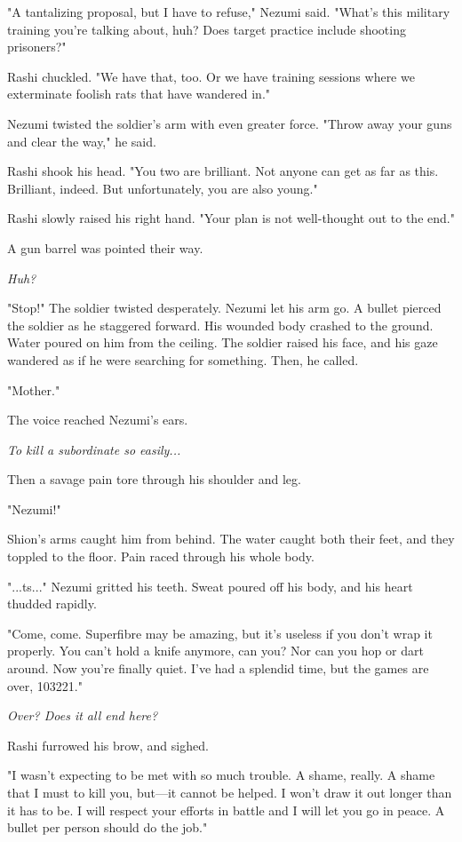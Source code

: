 "A tantalizing proposal, but I have to refuse," Nezumi said. "What's
this military training you're talking about, huh? Does target practice
include shooting prisoners?"

Rashi chuckled. "We have that, too. Or we have training sessions where
we exterminate foolish rats that have wandered in."

Nezumi twisted the soldier's arm with even greater force. "Throw away
your guns and clear the way," he said.

Rashi shook his head. "You two are brilliant. Not anyone can get as far
as this. Brilliant, indeed. But unfortunately, you are also young."

Rashi slowly raised his right hand. "Your plan is not well-thought out
to the end."

A gun barrel was pointed their way.

\emph{Huh?}

"Stop!" The soldier twisted desperately. Nezumi let his arm go. A bullet
pierced the soldier as he staggered forward. His wounded body crashed to
the ground. Water poured on him from the ceiling. The soldier raised his
face, and his gaze wandered as if he were searching for something. Then,
he called.

"Mother."

The voice reached Nezumi's ears.

\emph{To kill a subordinate so easily...}

Then a savage pain tore through his shoulder and leg.

"Nezumi!"

Shion's arms caught him from behind. The water caught both their feet,
and they toppled to the floor. Pain raced through his whole body.

"...ts..." Nezumi gritted his teeth. Sweat poured off his body, and his
heart thudded rapidly.

"Come, come. Superfibre may be amazing, but it's useless if you don't
wrap it properly. You can't hold a knife anymore, can you? Nor can you
hop or dart around. Now you're finally quiet. I've had a splendid time,
but the games are over, 103221."

\emph{Over? Does it all end here?}

Rashi furrowed his brow, and sighed.

"I wasn't expecting to be met with so much trouble. A shame, really. A
shame that I must to kill you, but---it cannot be helped. I won't draw it
out longer than it has to be. I will respect your efforts in battle and
I will let you go in peace. A bullet per person should do the job."

